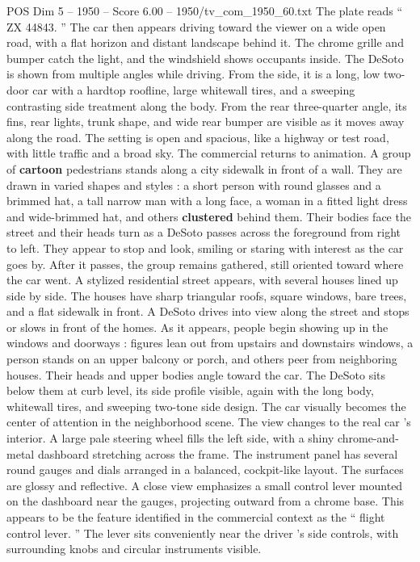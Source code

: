 \begin{textsample}{POS Dim 5 – 1950 – Score 6.00 – 1950/tv\_com\_1950\_60.txt}
The plate reads “ ZX 44843. ” The car then appears driving toward the viewer on a wide open road, with a flat horizon and distant landscape behind it.
The chrome grille and bumper catch the light, and the windshield shows occupants inside.
The DeSoto is shown from multiple angles while driving.
From the side, it is a long, low two-door car with a hardtop roofline, large whitewall tires, and a sweeping contrasting side treatment along the body.
From the rear three-quarter angle, its fins, rear lights, trunk shape, and wide rear bumper are visible as it moves away along the road.
The setting is open and spacious, like a highway or test road, with little traffic and a broad sky.
The commercial returns to animation.
A group of \textbf{cartoon} pedestrians stands along a city sidewalk in front of a wall.
They are drawn in varied shapes and styles : a short person with round glasses and a brimmed hat, a tall narrow man with a long face, a woman in a fitted light dress and wide-brimmed hat, and others \textbf{clustered} behind them.
Their bodies face the street and their heads turn as a DeSoto passes across the foreground from right to left.
They appear to stop and look, smiling or staring with interest as the car goes by.
After it passes, the group remains gathered, still oriented toward where the car went.
A stylized residential street appears, with several houses lined up side by side.
The houses have sharp triangular roofs, square windows, bare trees, and a flat sidewalk in front.
A DeSoto drives into view along the street and stops or slows in front of the homes.
As it appears, people begin showing up in the windows and doorways : figures lean out from upstairs and downstairs windows, a person stands on an upper balcony or porch, and others peer from neighboring houses.
Their heads and upper bodies angle toward the car.
The DeSoto sits below them at curb level, its side profile visible, again with the long body, whitewall tires, and sweeping two-tone side design.
The car visually becomes the center of attention in the neighborhood scene.
The view changes to the real car ’s interior.
A large pale steering wheel fills the left side, with a shiny chrome-and-metal dashboard stretching across the frame.
The instrument panel has several round gauges and dials arranged in a balanced, cockpit-like layout.
The surfaces are glossy and reflective.
A close view emphasizes a small control lever mounted on the dashboard near the gauges, projecting outward from a chrome base.
This appears to be the feature identified in the commercial context as the “ flight control lever. ” The lever sits conveniently near the driver ’s side controls, with surrounding knobs and circular instruments visible.

\end{textsample}
